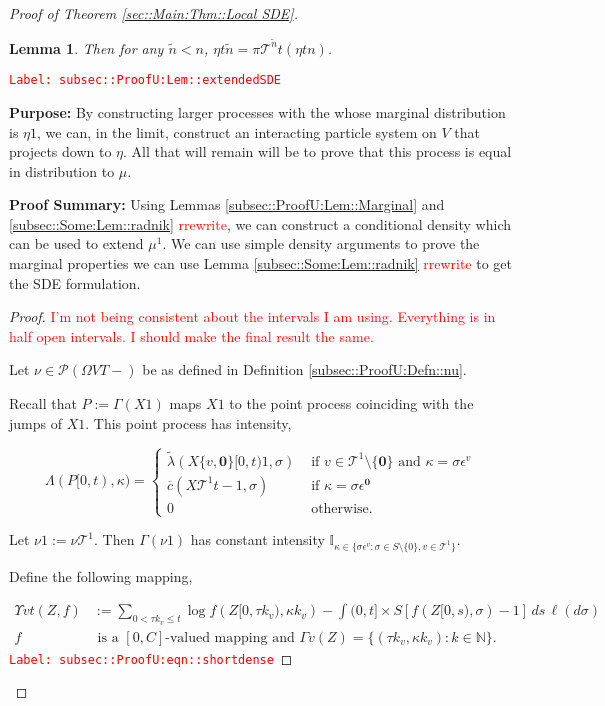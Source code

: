 \documentclass[12pt]{article}
\newcommand{\mb}{\mathbb}
\newcommand{\mc}{\mathcal}
\newcommand{\ov}{\overline}
\newcommand{\te}{\text}
\newcommand{\ep}{\epsilon}
\newcommand{\tr}{\textcolor{red}}
\newcommand{\labe}[1]{\tr{\texttt{Label: #1}}}
\newcommand{\purpose}{\textbf{Purpose: }}
\newcommand{\pfsum}{\textbf{Proof Summary: }}
\newcommand{\ind}{\hspace{24pt}}
\newcommand{\defeq}{:=}								%
\newcommand{\pmsr}{\mc{P}}							%
\renewcommand{\root}{\mathbf{0}}				%
\renewcommand{\v}{v}							%
\renewcommand{\S}{S}							%
\newcommand{\s}{\sigma}							%
\newcommand{\ev}{\ep}							%
\newcommand{\T}{T}								%
\renewcommand{\t}{t}							%
\newcommand{\proj}{\pi}							%
\renewcommand{\tt}{s}							%
\newcommand{\X}{X}								%
\newcommand{\vind}[1]{^{#1}}					%
\newcommand{\const}{C}							%
\newcommand{\IGrg}{\ov{c}}						%
\newcommand{\tree}{\mc{T}}						%
\newcommand{\sln}[1]{^{#1}}						%
\newcommand{\Sm}{\ell}							%
\newcommand{\alt}[1]{\widetilde{#1}}			%
\newcommand{\m}{\mu}							%
\newcommand{\mm}{\nu}							%
\newcommand{\mmm}{\eta}							%
\newcommand{\XXX}{Z}							%
\newcommand{\rt}{\tau}							%
\renewcommand{\it}{k}							%
\newcommand{\pmap}{\Gamma}						%
\renewcommand{\mark}{\kappa}					%
\newcommand{\rp}{P}								%
\newcommand{\ratee}{\Lambda}					%
\newcommand{\crate}{\alt{\lambda}}				%
\newcommand{\ds}{\Upsilon}						%
\newtheorem{lem}[thms]{Lemma}
\begin{document}
\begin{proof}[Proof of Theorem \ref{sec::Main:Thm::Local SDE}]
\begin{lem}
Then for any \(\alt{n} < n\), \(\mmm{}{\t}{\alt{n}} = \proj{\tree\sln{\alt{n}}}{\t}(\mmm{}{\t}{n})\).
\label{subsec::ProofU:Lem::extendedSDE}
\end{lem}
\labe{subsec::ProofU:Lem::extendedSDE}

\purpose By constructing larger processes with the whose marginal distribution is \(\mmm{}{}{1}\), we can, in the limit, construct an interacting particle system on \(V\) that projects down to \(\mmm{}{}{}\). All that will remain will be to prove that this process is equal in distribution to \(\m{}{}{}\).

\pfsum Using Lemmas \ref{subsec::ProofU:Lem::Marginal} and \ref{subsec::Some:Lem::radnik} \tr{rrewrite}, we can construct a conditional density which can be used to extend \(\mu\sln{1}\). We can use simple density arguments to prove the marginal properties we can use Lemma \ref{subsec::Some:Lem::radnik} \tr{rrewrite} to get the SDE formulation.

\begin{proof}
\tr{I'm not being consistent about the intervals I am using. Everything is in half open intervals. I should make the final result the same.}

Let \(\mm{}{}{} \in \pmsr(\Omega{V}{\T-})\) be as defined in Definition \ref{subsec::ProofU:Defn::nu}.

\ind Recall that \(\rp{} \defeq \pmap{}(\X{}{}{1})\) maps \(\X{}{}{1}\) to the point process coinciding with the jumps of \(\X{}{}{1}\). This point process has intensity,

\[\ratee{}(\rp{}[0,\t),\mark{}) = \begin{cases}
\crate{}{}(\X{\{\v,\root\}}{[0,\t)}{1},\s) &\te{ if } \v\in \tree\sln{1}\setminus\{\root\}\te{ and } \mark{} = \s\ev\vind{\v}\\
\IGrg{}(\X{\tree\sln{1}}{\t-}{1},\s) &\te{ if } \mark{} = \s\ev\vind{\root}\\
0 &\te{ otherwise}.
\end{cases}\]

Let \(\mm{}{}{1} \defeq \mm{\tree\sln{1}}{}{}\). Then \(\pmap{}(\mm{}{}{1})\) has constant intensity \(\mb{I}_{\kappa \in\{\s\ev\vind{\v}:\s\in\S\setminus\{0\},\v\in\tree\sln{1}\}}\). 

\ind Define the following mapping,

\begin{align}
\ds{\v}{\t}(\XXX{}{},f) &\defeq \sum_{0 < \rt{\it}_\v \leq \t} \log{f(\XXX{}{[0,\rt{\it}_\v)},\mark{\it}_\v)} - \int{(0,\t]\times \S} [f(\XXX{}{[0,\tt)},\s) - 1]\,ds\,\Sm(d\s) \label{subsec::ProofU:eqn::shortdense}\\
f&\te{ is a }[0,\const{}] \te{-valued mapping and } \pmap{\v}(\XXX{}{}) = \{(\rt{\it}_\v,\mark{\it}_\v):\it\in\mb{N}\}.\nonumber
\end{align} 
\labe{subsec::ProofU:eqn::shortdense}


\end{proof}
\end{proof}
\end{document}
